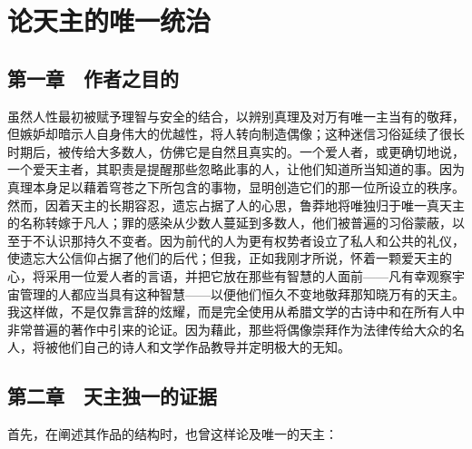 
\chapter{论天主的唯一统治}



\section{第一章　作者之目的}

虽然人性最初被赋予理智与安全的结合，以辨别真理及对万有唯一主当有的敬拜，但嫉妒却暗示人自身伟大的优越性，将人转向制造偶像；这种迷信习俗延续了很长时期后，被传给大多数人，仿佛它是自然且真实的。一个爱人者，或更确切地说，一个爱天主者，其职责是提醒那些忽略此事的人，让他们知道所当知道的事。因为真理本身足以藉着穹苍之下所包含的事物，显明创造它们的那一位所设立的秩序。然而，因着天主的长期容忍，遗忘占据了人的心思，鲁莽地将唯独归于唯一真天主的名称转嫁于凡人；罪的感染从少数人蔓延到多数人，他们被普遍的习俗蒙蔽，以至于不认识那持久不变者。因为前代的人为更有权势者设立了私人和公共的礼仪，使遗忘大公信仰占据了他们的后代；但我，正如我刚才所说，怀着一颗爱天主的心，将采用一位爱人者的言语，并把它放在那些有智慧的人面前——凡有幸观察宇宙管理的人都应当具有这种智慧——以便他们恒久不变地敬拜那知晓万有的天主。我这样做，不是仅靠言辞的炫耀，而是完全使用从希腊文学的古诗中和在所有人中非常普遍的著作中引来的论证。因为藉此，那些将偶像崇拜作为法律传给大众的名人，将被他们自己的诗人和文学作品教导并定明极大的无知。\par


\section{第二章　天主独一的证据}

首先，在阐述其作品的结构时，也曾这样论及唯一的天主：\par

